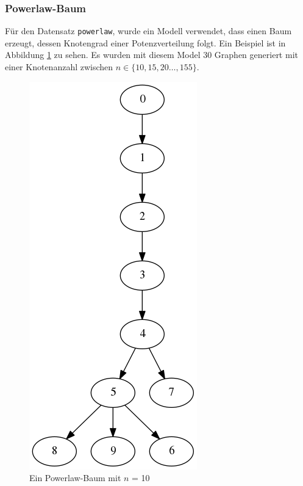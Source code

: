 \documentclass[12pt,a4paper,onecolumn,oneside,titlepage]{article}
\newcommand{\vars}{\texttt}
\begin{document}
\subsubsection{Powerlaw-Baum}
Für den Datensatz \vars{powerlaw}, wurde ein Modell verwendet, dass einen Baum erzeugt, dessen Knotengrad einer Potenzverteilung folgt. Ein Beispiel ist in Abbildung \ref{fig:powerlaw-tree} zu sehen.
Es wurden mit diesem Model 30 Graphen generiert mit einer Knotenanzahl zwischen $n \in \{10,15,20…,155\}$.
\begin{figure}
\includegraphics[scale=0.35]{dot/dot_powerlaw.png}
\caption{Ein Powerlaw-Baum mit $n$ = 10}
\label{fig:powerlaw-tree}
\end{figure}
\end{document}
